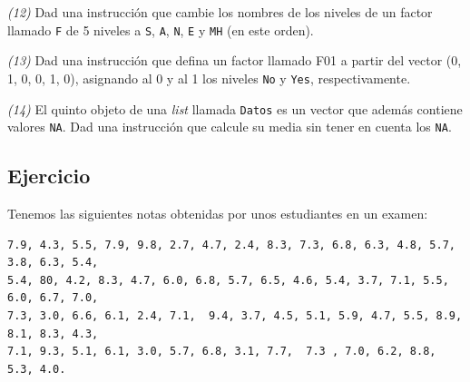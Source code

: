 \documentclass[
]{book}
\theoremstyle{definition}
\theoremstyle{definition}
\theoremstyle{definition}
\theoremstyle{remark}
\begin{document}
\emph{(12)} Dad una instrucción que cambie los nombres de los niveles de un factor llamado \texttt{F} de 5 niveles a \texttt{S}, \texttt{A}, \texttt{N}, \texttt{E} y \texttt{MH} (en este orden).

\emph{(13)} Dad una instrucción que defina un factor llamado F01 a partir del vector (0, 1, 0, 0, 1, 0), asignando al 0 y al 1 los niveles \texttt{No} y \texttt{Yes}, respectivamente.

\emph{(14)} El quinto objeto de una \emph{list} llamada \texttt{Datos} es un vector que además contiene valores \texttt{NA}. Dad una instrucción que calcule su media sin tener en cuenta los \texttt{NA}.

\hypertarget{ejercicio-2}{%
\subsection*{Ejercicio}\label{ejercicio-2}}

Tenemos las siguientes notas obtenidas por unos estudiantes en un examen:

\begin{verbatim}
7.9, 4.3, 5.5, 7.9, 9.8, 2.7, 4.7, 2.4, 8.3, 7.3, 6.8, 6.3, 4.8, 5.7, 3.8, 6.3, 5.4, 
5.4, 80, 4.2, 8.3, 4.7, 6.0, 6.8, 5.7, 6.5, 4.6, 5.4, 3.7, 7.1, 5.5, 6.0, 6.7, 7.0, 
7.3, 3.0, 6.6, 6.1, 2.4, 7.1,  9.4, 3.7, 4.5, 5.1, 5.9, 4.7, 5.5, 8.9, 8.1, 8.3, 4.3,
7.1, 9.3, 5.1, 6.1, 3.0, 5.7, 6.8, 3.1, 7.7,  7.3 , 7.0, 6.2, 8.8, 5.3, 4.0.
\end{verbatim}
\end{document}
